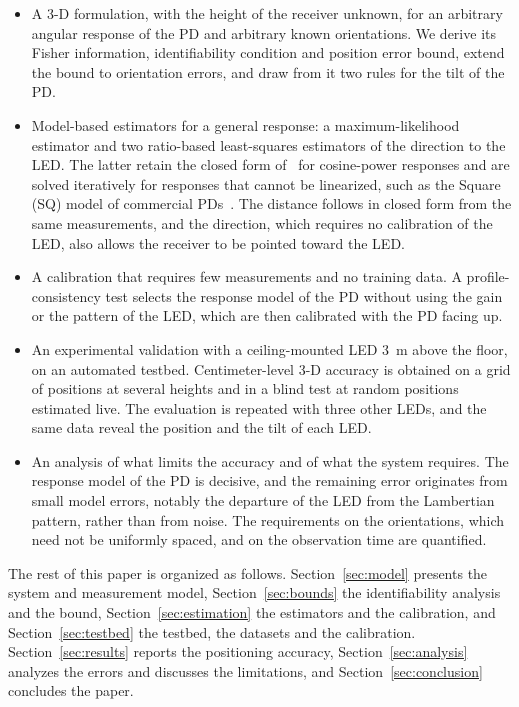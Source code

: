 \begin{itemize}
 \item A \mbox{3-D} formulation, with the height of the receiver unknown, for an arbitrary angular response of the PD and arbitrary known orientations. We derive its Fisher information, identifiability condition and position error bound, extend the bound to orientation errors, and draw from it two rules for the tilt of the PD.
 \item Model-based estimators for a general response: a maximum-likelihood estimator and two ratio-based least-squares estimators of the direction to the LED. The latter retain the closed form of~\cite{Acuna2026} for cosine-power responses and are solved iteratively for responses that cannot be linearized, such as the Square (SQ) model of commercial PDs~\cite{Bastiaens2020}. The distance follows in closed form from the same measurements, and the direction, which requires no calibration of the LED, also allows the receiver to be pointed toward the LED.
 \item A calibration that requires few measurements and no training data. A profile-consistency test selects the response model of the PD without using the gain or the pattern of the LED, which are then calibrated with the PD facing up.
 \item An experimental validation with a ceiling-mounted LED 3~m above the floor, on an automated testbed. Centimeter-level \mbox{3-D} accuracy is obtained on a grid of positions at several heights and in a blind test at random positions estimated live. The evaluation is repeated with three other LEDs, and the same data reveal the position and the tilt of each LED.
 \item An analysis of what limits the accuracy and of what the system requires. The response model of the PD is decisive, and the remaining error originates from small model errors, notably the departure of the LED from the Lambertian pattern, rather than from noise. The requirements on the orientations, which need not be uniformly spaced, and on the observation time are quantified.
\end{itemize}

The rest of this paper is organized as follows. Section~\ref{sec:model} presents the system and measurement model, Section~\ref{sec:bounds} the identifiability analysis and the bound, Section~\ref{sec:estimation} the estimators and the calibration, and Section~\ref{sec:testbed} the testbed, the datasets and the calibration. Section~\ref{sec:results} reports the positioning accuracy, Section~\ref{sec:analysis} analyzes the errors and discusses the limitations, and Section~\ref{sec:conclusion} concludes the paper.
